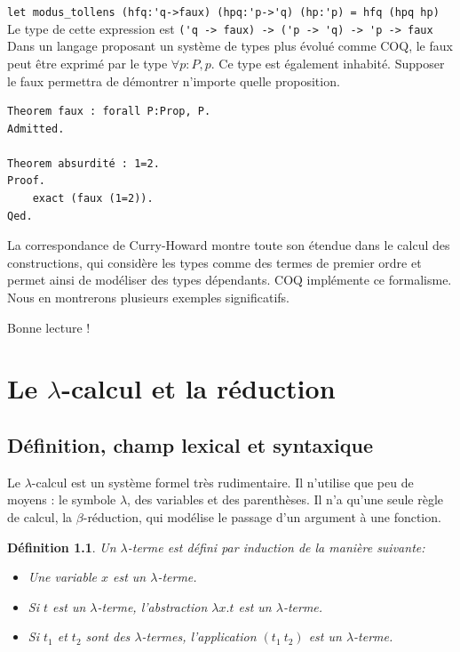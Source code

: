 \documentclass[11pt]{book}
\newtheorem{definition}{Définition}
\begin{document}
\verb+let modus_tollens (hfq:'q->faux) (hpq:'p->'q) (hp:'p) = hfq (hpq hp)+  \\
Le type de cette expression est  \verb+('q -> faux) -> ('p -> 'q) -> 'p -> faux+  \\

Dans un langage proposant un système de types plus évolué comme COQ, le faux peut être exprimé 
par le type $\forall p:P, p$. Ce type est également inhabité. Supposer le faux permettra de démontrer 
n'importe quelle proposition.

\begin{Verbatim}
Theorem faux : forall P:Prop, P.
Admitted.

Theorem absurdité : 1=2.
Proof.
    exact (faux (1=2)). 
Qed.
\end{Verbatim}

La correspondance de Curry-Howard montre toute son étendue dans le calcul des constructions, qui 
considère les types comme des termes de premier ordre et permet ainsi de modéliser des types dépendants.
COQ implémente ce formalisme.
Nous en montrerons plusieurs exemples significatifs.

\vspace{0.3cm}
Bonne lecture !

\chapter{Le $\lambda$-calcul et la réduction}

\section{Définition, champ lexical et syntaxique}
Le $\lambda$-calcul est un système formel très rudimentaire. Il n'utilise que  
peu de moyens : le symbole $\lambda$, des variables et des parenthèses. Il n'a
qu'une seule règle de calcul, la $\beta$-réduction, qui modélise le passage d'un
argument à une fonction.

\begin{definition}
Un $\lambda $-terme est défini par induction de la manière suivante:
\begin{itemize}
  \item Une  variable $x$ est un $\lambda$-terme.
  \item Si $t$ est un $\lambda$-terme, l'abstraction $\lambda x.t$ est un $\lambda$-terme.
  \item Si $t_1$ et $t_2$ sont des $\lambda$-termes, l'application $(t_1 \ t_2)$ est un $\lambda$-terme.
\end{itemize}
\end{definition}
\end{document}
